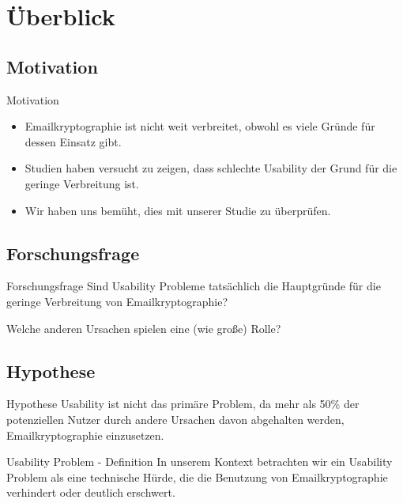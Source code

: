 \documentclass[]{beamer}
\begin{document}
\begin{frame}
	\titlepage
\end{frame}


\section{Überblick}
\begin{frame}
\end{frame}

\subsection{Motivation}
\begin{frame}{Motivation}
\begin{itemize}
	\item Emailkryptographie ist nicht weit verbreitet, obwohl es viele Gründe für dessen Einsatz gibt.
	\item Studien haben versucht zu zeigen, dass schlechte Usability der Grund für die geringe Verbreitung ist.
	\item Wir haben uns bemüht, dies mit unserer Studie zu überprüfen.
\end{itemize}
\end{frame}


\subsection{Forschungsfrage}
\begin{frame}{Forschungsfrage}
	Sind Usability Probleme tatsächlich die Hauptgründe für die geringe Verbreitung von Email\-kryp\-to\-gra\-phie?

	Welche anderen Ursachen spielen eine (wie große) Rolle?
\end{frame}

\subsection{Hypothese}
\begin{frame}{Hypothese}
	Usability ist nicht das primäre Problem, da mehr als 50\% der
	potenziellen Nutzer durch andere Ursachen davon abgehalten werden,
	Email\-kryp\-to\-gra\-phie einzusetzen.
\begin{block}{Usability Problem - Definition}
	In unserem Kontext betrachten wir ein Usability Problem als eine technische Hürde,
	die die Benutzung von Emailkryptographie verhindert oder deutlich erschwert.
\end{block}
\end{frame}
\end{document}
